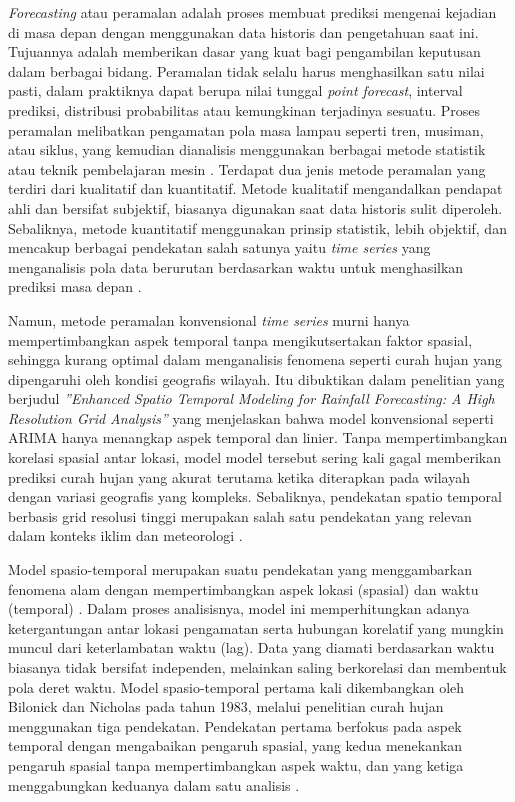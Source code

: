 \textit{Forecasting} atau peramalan adalah proses membuat prediksi mengenai kejadian di masa depan dengan menggunakan data historis dan pengetahuan saat ini. Tujuannya adalah memberikan dasar yang kuat bagi pengambilan keputusan dalam berbagai bidang. Peramalan tidak selalu harus menghasilkan satu nilai pasti, dalam praktiknya dapat berupa nilai tunggal \textit{point forecast}, interval prediksi, distribusi probabilitas atau kemungkinan terjadinya sesuatu. Proses peramalan melibatkan pengamatan pola masa lampau seperti tren, musiman, atau siklus, yang kemudian dianalisis menggunakan berbagai metode statistik atau teknik pembelajaran mesin \citep{petropoulos2021forecasting}. Terdapat dua jenis metode peramalan yang terdiri dari kualitatif dan kuantitatif. Metode kualitatif mengandalkan pendapat ahli dan bersifat subjektif, biasanya digunakan saat data historis sulit diperoleh. Sebaliknya, metode kuantitatif menggunakan prinsip statistik, lebih objektif, dan mencakup berbagai pendekatan salah satunya yaitu \textit{time series} yang menganalisis pola data berurutan berdasarkan waktu untuk menghasilkan prediksi masa depan \citep{ruchjana2019spatiotemporal}.

Namun, metode peramalan konvensional \textit{time series} murni hanya mempertimbangkan aspek temporal tanpa mengikutsertakan faktor spasial, sehingga kurang optimal dalam menganalisis fenomena seperti curah hujan yang dipengaruhi oleh kondisi geografis wilayah. Itu dibuktikan dalam penelitian yang berjudul \textit{”Enhanced Spatio Temporal Modeling for Rainfall Forecasting: A High Resolution Grid Analysis”} yang menjelaskan bahwa model konvensional seperti ARIMA hanya menangkap aspek temporal dan linier. Tanpa mempertimbangkan korelasi spasial antar lokasi, model model tersebut sering kali gagal memberikan prediksi curah hujan yang akurat terutama ketika diterapkan pada wilayah dengan variasi geografis yang kompleks. Sebaliknya, pendekatan spatio temporal berbasis grid resolusi tinggi merupakan salah satu pendekatan yang relevan dalam konteks iklim dan meteorologi \citep{alam2024enhanced}.

Model spasio-temporal merupakan suatu pendekatan yang menggambarkan fenomena alam dengan mempertimbangkan aspek lokasi (spasial) dan waktu (temporal) \citep{utami2017gs3sls}. Dalam proses analisisnya, model ini memperhitungkan adanya ketergantungan antar lokasi pengamatan serta hubungan korelatif yang mungkin muncul dari keterlambatan waktu (lag). Data yang diamati berdasarkan waktu biasanya tidak bersifat independen, melainkan saling berkorelasi dan membentuk pola deret waktu. Model spasio-temporal pertama kali dikembangkan oleh Bilonick dan Nicholas pada tahun 1983, melalui penelitian curah hujan menggunakan tiga pendekatan. Pendekatan pertama berfokus pada aspek temporal dengan mengabaikan pengaruh spasial, yang kedua menekankan pengaruh spasial tanpa mempertimbangkan aspek waktu, dan yang ketiga menggabungkan keduanya dalam satu analisis \citep{islami2021spatiotemporal}.

